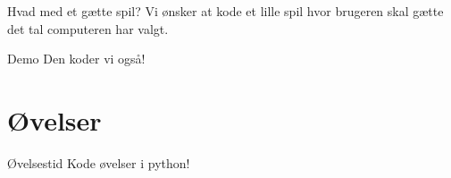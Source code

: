 \documentclass[12pt,t]{beamer}
\begin{document}
    \begin{frame}{Hvad med et gætte spil?}
         Vi ønsker at kode et lille spil hvor brugeren skal gætte
         det tal computeren har valgt.

        \begin{block}{Demo}
            Den koder vi også!
        \end{block}
    \end{frame}

    \section{Øvelser}
    \begin{frame}[t]{Øvelsestid}
        Kode øvelser i python!
    \end{frame}
\end{document}
